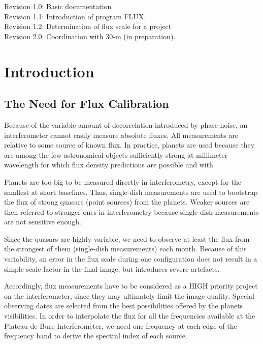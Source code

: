 \documentclass[11pt]{article}
\begin{document}
Revision 1.0: Basic documentation\\
Revision 1.1: Introduction of program FLUX.\\
Revision 1.2: Determination of flux scale for a project\\
Revision 2.0: Coordination with 30-m (in preparation).

\newpage
\tableofcontents

\newpage

\section{Introduction}

\subsection{The Need for Flux Calibration}

Because of the variable amount of decorrelation introduced by phase noise,
an interferometer cannot easily measure absolute fluxes. All measurements
are relative to some source of known flux. In practice, planets are used
because they are among the few astronomical objects sufficiently strong at
millimeter wavelength for which flux density predictions are possible and
with

Planets are too big to be measured directly in interferometry, except for
the smallest at short baselines. Thus, single-dish measurements are used to
bootstrap the flux of strong quasars (point sources) from the planets.
Weaker sources are then referred to stronger ones in interferometry because
single-dish measurements are not sensitive enough.

Since the quasars are highly variable, we need to observe at least the flux
from the strongest of them (single-dish measurements) each month.  Because
of this variability, an error in the flux scale during one configuration
does not result in a simple scale factor in the final image, but introduces
severe artefacts.

Accordingly, flux measurements have to be considered as a HIGH priority
project on the interferometer, since they may ultimately limit the image
quality. Special observing dates are selected from the best possibilities
offered by the planets visibilities.  In order to interpolate the flux for
all the frequencies available at the Plateau de Bure Interferometer, we
need one frequency at each edge of the frequency band to derive the
spectral index of each source.
\end{document}
